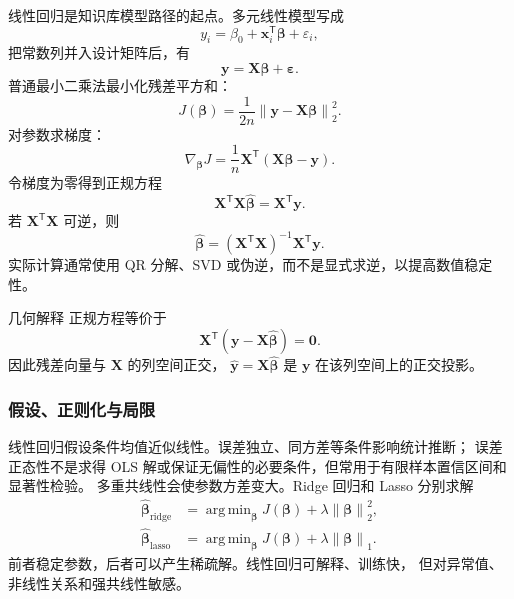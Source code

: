 \documentclass[UTF8,zihao=-4,a4paper,fontset=windows]{ctexart}
\DeclareMathOperator*{\argmin}{arg\,min}
\newcommand{\norm}[1]{\left\lVert #1\right\rVert}
\begin{document}
线性回归是知识库模型路径的起点\cite{aikb}。多元线性模型写成
\begin{equation}
  y_i=\beta_0+\bm{x}_i^{\mathsf T}\bm{\beta}+\varepsilon_i,
\end{equation}
把常数列并入设计矩阵后，有
\begin{equation}
  \bm{y}=\bm{X}\bm{\beta}+\bm{\varepsilon}.
\end{equation}
普通最小二乘法最小化残差平方和：
\begin{equation}
  J(\bm{\beta})
  =\frac{1}{2n}\norm{\bm{y}-\bm{X}\bm{\beta}}_2^2.
\end{equation}
对参数求梯度：
\begin{equation}
  \nabla_{\bm{\beta}}J
  =\frac{1}{n}\bm{X}^{\mathsf T}
  (\bm{X}\bm{\beta}-\bm{y}).
\end{equation}
令梯度为零得到正规方程
\begin{equation}
  \bm{X}^{\mathsf T}\bm{X}\hat{\bm{\beta}}
  =\bm{X}^{\mathsf T}\bm{y}.
\end{equation}
若 $\bm{X}^{\mathsf T}\bm{X}$ 可逆，则
\begin{equation}
  \hat{\bm{\beta}}
  =(\bm{X}^{\mathsf T}\bm{X})^{-1}
  \bm{X}^{\mathsf T}\bm{y}.
  \label{eq:ols}
\end{equation}
实际计算通常使用 QR 分解、SVD 或伪逆，而不是显式求逆，以提高数值稳定性。

\begin{derivationbox}{几何解释}
正规方程等价于
\[
  \bm{X}^{\mathsf T}(\bm{y}-\bm{X}\hat{\bm{\beta}})=\bm{0}.
\]
因此残差向量与 $\bm{X}$ 的列空间正交，
$\hat{\bm{y}}=\bm{X}\hat{\bm{\beta}}$ 是 $\bm{y}$ 在该列空间上的正交投影。
\end{derivationbox}

\subsubsection{假设、正则化与局限}

线性回归假设条件均值近似线性。误差独立、同方差等条件影响统计推断；
误差正态性不是求得 OLS 解或保证无偏性的必要条件，但常用于有限样本置信区间和显著性检验。
多重共线性会使参数方差变大。Ridge 回归和 Lasso 分别求解
\begin{align}
  \hat{\bm{\beta}}_{\mathrm{ridge}}
  &=\argmin_{\bm{\beta}}
  J(\bm{\beta})+\lambda\norm{\bm{\beta}}_2^2,\\
  \hat{\bm{\beta}}_{\mathrm{lasso}}
  &=\argmin_{\bm{\beta}}
  J(\bm{\beta})+\lambda\norm{\bm{\beta}}_1.
\end{align}
前者稳定参数，后者可以产生稀疏解。线性回归可解释、训练快，
但对异常值、非线性关系和强共线性敏感。
\end{document}
